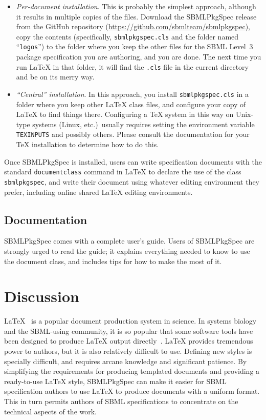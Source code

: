 \documentclass{bmcart}
\newcommand{\sbmlpkg}{SBMLPkgSpec}
\newcommand{\sbmlpkgfile}{\texttt{sbmlpkgspec.cls}}
\newcommand{\githuburl}{https://github.com/sbmlteam/sbmlpkgspec}
\begin{document}
\begin{itemize}

\item \emph{Per-document installation}.  This is probably the simplest approach, although it results in multiple copies of the files.  Download the \sbmlpkg{} release from the GitHub repository (\url{\githuburl}), copy the contents (specifically, \sbmlpkgfile{} and the folder named ``\texttt{logos}'') to the folder where you keep the other files for the SBML Level~3 package specification you are authoring, and you are done.  The next time you run LaTeX in that folder, it will find the \texttt{.cls} file in the current directory and be on its merry way.

\item \emph{``Central'' installation}.  In this approach, you install \sbmlpkgfile{} in a folder where you keep other LaTeX class files, and configure your copy of LaTeX to find things there.  Configuring a TeX system in this way on Unix-type systems (Linux, etc.)\ usually requires setting the environment variable \texttt{TEXINPUTS} and possibly others.  Please consult the documentation for your TeX installation to determine how to do this.

\end{itemize}

Once \sbmlpkg{} is installed, users can write specification documents with the standard \texttt{documentclass} command in LaTeX to declare the use of the class \texttt{sbmlpkgspec}, and write their document using whatever editing environment they prefer, including online shared LaTeX editing environments.


\subsection*{Documentation}

\sbmlpkg{} comes with a complete user's guide.  Users of \sbmlpkg{} are strongly urged to read the guide; it explains everything needed to know to use the document class, and includes tips for how to make the most of it.  


\section*{Discussion}

LaTeX~\cite{lamport1994} is a popular document production system in science.  In systems biology and the SBML-using community, it is so popular that some software tools have been designed to produce LaTeX output directly~\cite{drager2009sbml2latex, shen2010sbml2tikz}.  LaTeX provides tremendous power to authors, but it is also relatively difficult to use.  Defining new styles is specially difficult, and requires arcane knowledge and significant patience.  By simplifying the requirements for producing templated documents and providing a ready-to-use LaTeX style, \sbmlpkg{} can make it easier for SBML specification authors to use LaTeX to produce documents with a uniform format.  This in turn permits authors of SBML specifications to concentrate on the technical aspects of the work.
\end{document}
